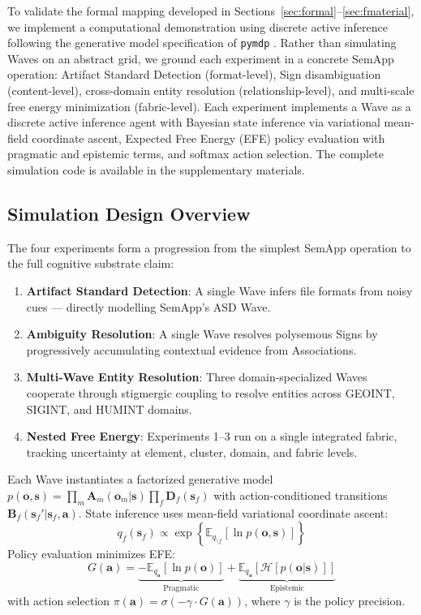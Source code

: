 \documentclass[11pt,a4paper]{article}
\theoremstyle{definition}
\newcommand{\E}{\mathbb{E}}
\newcommand{\bq}{q}
\newcommand{\bp}{p}
\newcommand{\bo}{\bm{o}}
\newcommand{\bs}{\bm{s}}
\newcommand{\ba}{\bm{a}}
\begin{document}
To validate the formal mapping developed in Sections~\ref{sec:formal}--\ref{sec:fmaterial}, we implement a computational demonstration using discrete active inference following the generative model specification of \texttt{pymdp} \citep{heins2022pymdp}. Rather than simulating Waves on an abstract grid, we ground each experiment in a concrete SemApp operation: Artifact Standard Detection (format-level), Sign disambiguation (content-level), cross-domain entity resolution (relationship-level), and multi-scale free energy minimization (fabric-level). Each experiment implements a Wave as a discrete active inference agent with Bayesian state inference via variational mean-field coordinate ascent, Expected Free Energy (EFE) policy evaluation with pragmatic and epistemic terms, and softmax action selection. The complete simulation code is available in the supplementary materials.

\subsection{Simulation Design Overview}

The four experiments form a progression from the simplest SemApp operation to the full cognitive substrate claim:

\begin{enumerate}[noitemsep]
\item \textbf{Artifact Standard Detection}: A single Wave infers file formats from noisy cues --- directly modelling SemApp's ASD Wave.
\item \textbf{Ambiguity Resolution}: A single Wave resolves polysemous Signs by progressively accumulating contextual evidence from Associations.
\item \textbf{Multi-Wave Entity Resolution}: Three domain-specialized Waves cooperate through stigmergic coupling to resolve entities across GEOINT, SIGINT, and HUMINT domains.
\item \textbf{Nested Free Energy}: Experiments 1--3 run on a single integrated fabric, tracking uncertainty at element, cluster, domain, and fabric levels.
\end{enumerate}

Each Wave instantiates a factorized generative model $\bp(\bo, \bs) = \prod_m \mathbf{A}_m(\bo_m | \bs) \prod_f \mathbf{D}_f(\bs_f)$ with action-conditioned transitions $\mathbf{B}_f(\bs_f' | \bs_f, \ba)$. State inference uses mean-field variational coordinate ascent:
\begin{equation}
\bq_f(\bs_f) \propto \exp\!\left\{ \E_{\bq_{\setminus f}}\!\left[\ln \bp(\bo, \bs)\right] \right\}
\end{equation}
Policy evaluation minimizes EFE:
\begin{equation}
G(\ba) = \underbrace{-\E_{\bq_{\ba}}\!\left[\ln \bp(\bo)\right]}_{\text{Pragmatic}} + \underbrace{\E_{\bq_{\ba}}\!\left[\mathcal{H}\!\left[\bp(\bo|\bs)\right]\right]}_{\text{Epistemic}}
\end{equation}
with action selection $\pi(\ba) = \sigma(-\gamma \cdot G(\ba))$, where $\gamma$ is the policy precision.
\end{document}
